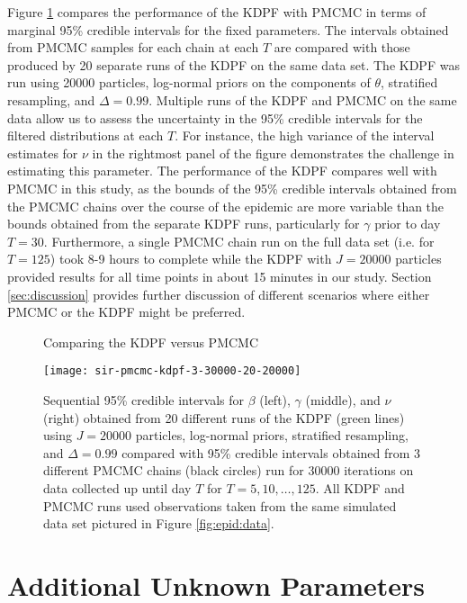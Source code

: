 Figure \ref{fig:epid:pmcmc} compares the performance of the KDPF with PMCMC in terms of marginal 95\% credible intervals for the fixed parameters. The intervals obtained from PMCMC samples for each chain at each $T$ are compared with those produced by 20 separate runs of the KDPF on the same data set. The KDPF was run using 20000 particles, log-normal priors on the components of $\theta$, stratified resampling, and $\Delta = 0.99$. Multiple runs of the KDPF and PMCMC on the same data allow us to assess the uncertainty in the 95\% credible intervals for the filtered distributions at each $T$. For instance, the high variance of the interval estimates for $\nu$ in the rightmost panel of the figure demonstrates the challenge in estimating this parameter. The performance of the KDPF compares well with PMCMC in this study, as the bounds of the 95\% credible intervals obtained from the PMCMC chains over the course of the epidemic are more variable than the bounds obtained from the separate KDPF runs, particularly for $\gamma$ prior to day $T = 30$. Furthermore, a single PMCMC chain run on the full data set (i.e. for $T = 125$) took 8-9 hours to complete while the KDPF with $J = 20000$ particles provided results for all time points in about 15 minutes in our study. Section \ref{sec:discussion} provides further discussion of different scenarios where either PMCMC or the KDPF might be preferred.

\begin{figure}
\ssp
\centering
\caption{Comparing the KDPF versus PMCMC} \label{fig:epid:pmcmc}
\texttt{[image: sir-pmcmc-kdpf-3-30000-20-20000]}
\caption*{Sequential 95\% credible intervals for $\beta$ (left), $\gamma$ (middle), and $\nu$ (right) obtained from 20 different runs of the KDPF (green lines) using $J = 20000$ particles, log-normal priors, stratified resampling, and $\Delta = 0.99$ compared with 95\% credible intervals obtained from 3 different PMCMC chains (black circles) run for 30000 iterations on data collected up until day $T$ for $T = 5,10,\ldots,125$. All KDPF and PMCMC runs used observations taken from the same simulated data set pictured in Figure \ref{fig:epid:data}.}
\end{figure}

\section{Additional Unknown Parameters} \label{sec:epid:extend}

